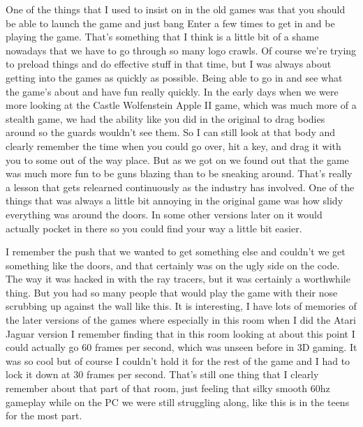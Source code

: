 One of the things that I used to insist on in the old games was that you should be able to launch the game and just bang Enter a few times to get in and be playing the game. That's something that I think is a little bit of a shame nowadays that we have to go through so many logo crawls. Of course we're trying to preload things and do effective stuff in that time, but I was always about getting into the games as quickly as possible. Being able to go in and see what the game's about and have fun really quickly. In the early days when we were more looking at the Castle Wolfenstein Apple II game, which was much more of a stealth game, we had the ability like you did in the original to drag bodies around so the guards wouldn't see them. So I can still look at that body and clearly remember the time when you could go over, hit a key, and drag it with you to some out of the way place. But as we got on we found out that the game was much more fun to be guns blazing than to be sneaking around. That's really a lesson that gets relearned continuously as the industry has involved. One of the things that was always a little bit annoying in the original game was how slidy everything was around the doors. In some other versions later on it would actually pocket in there so you could find your way a little bit easier.\\ \par

I remember the push that we wanted to get something else and couldn't we get something like the doors, and that certainly was on the ugly side on the code. The way it was hacked in with the ray tracers, but it was certainly a worthwhile thing. But you had so many people that would play the game with their nose scrubbing up against the wall like this. It is interesting, I have lots of memories of the later versions of the games where especially in this room when I did the Atari Jaguar version I remember finding that in this room looking at about this point I could actually go 60 frames per second, which was unseen before in 3D gaming. It was so cool but of course I couldn't hold it for the rest of the game and I had to lock it down at 30 frames per second. That's still one thing that I clearly remember about that part of that room, just feeling that silky smooth 60hz gameplay while on the PC we were still struggling along, like this is in the teens for the most part.\\ \par

